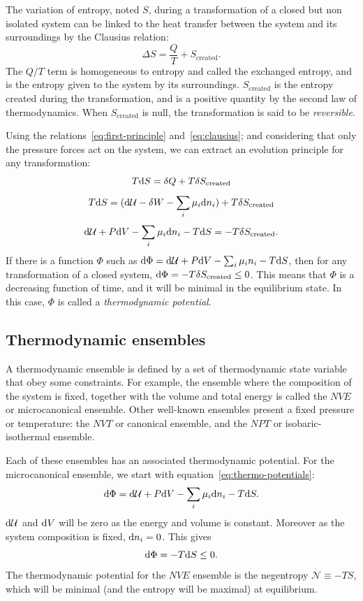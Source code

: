 \documentclass[thesis]{subfiles}
\begin{document}
The variation of entropy, noted $S$, during a transformation of a closed but non
isolated system can be linked to the heat transfer between the system and its
surroundings by the Clausius relation:
\[\Delta S = \frac Q T + S_\text{created}. \label{eq:clausius}\]
The $Q/T$ term is homogeneous to entropy and called the exchanged entropy,
and is the entropy given to the system by its surroundings. $S_\text{created}$
is the entropy created during the transformation, and is a positive quantity by
the second law of thermodynamics. When $S_\text{created}$ is null, the
transformation is said to be \emph{reversible}.

Using the relations~\eqref{eq:first-principle} and~\eqref{eq:clausius}; and
considering that only the pressure forces act on the system, we can extract an
evolution principle for any transformation:
\[T \text{d} S = \delta Q + T \delta S_\text{created}\]
\[T \text{d} S = (\text{d} \mathcal{U} - \delta W - \sum_i \mu_i \text{d} n_i) + T \delta S_\text{created}\]
\[\text{d} \mathcal{U} + P \text{d} V - \sum_i \mu_i \text{d} n_i - T \text{d} S = -T\delta S_\text{created}.\label{eq:thermo-potentials}\]
If there is a function $\Phi$ such as $\text{d} \Phi = \text{d} \mathcal{U} + P \text{d} V - \sum_i \mu_i
n_i - T \text{d} S$, then for any transformation of a closed system, $\text{d} \Phi =
-T\delta S_\text{created} \leq 0$. This means that $\Phi$ is a decreasing
function of time, and it will be minimal in the equilibrium state. In this case,
$\Phi$ is called a \emph{thermodynamic potential}.

\subsection{Thermodynamic ensembles}

A thermodynamic ensemble is defined by a set of thermodynamic state variable
that obey some constraints. For example, the ensemble where the composition of
the system is fixed, together with the volume and total energy is called the
$NVE$ or microcanonical ensemble. Other well-known ensembles present a fixed
pressure or temperature: the $NVT$ or canonical ensemble, and the $NPT$ or
isobaric-isothermal ensemble.

Each of these ensembles has an associated thermodynamic potential. For the
microcanonical ensemble, we start with equation~\eqref{eq:thermo-potentials}:
\[\text{d} \Phi = \text{d} \mathcal{U} + P \text{d} V - \sum_i \mu_i \text{d} n_i - T \text{d} S.\]
$\text{d} \mathcal{U}$ and $\text{d} V$ will be zero as the energy and volume is constant.
Moreover as the system composition is fixed, $\text{d} n_i = 0$. This gives
\[\text{d} \Phi = - T \text{d} S \leq 0.\]
The thermodynamic potential for the $NVE$ ensemble is the negentropy
$\mathcal{N} \equiv -TS$, which will be minimal (and the entropy will be
maximal) at equilibrium.
\end{document}

